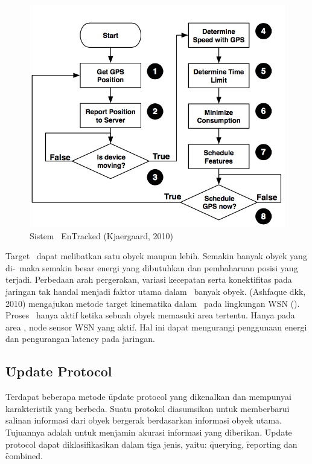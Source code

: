 \noindent
\begin{figure}
  \centering
  \includegraphics[scale=0.50]
  {images/2-entracked.png}
\caption{Sistem \Tracking~EnTracked (Kjaergaard, 2010)}
\label{fig:entracked}
\end{figure}

Target \tracking~dapat melibatkan satu obyek maupun lebih. Semakin banyak obyek
yang di-\tracking~maka semakin besar energi yang dibutuhkan dan pembaharuan
posisi yang terjadi. Perbedaan arah pergerakan, variasi kecepatan serta
konektifitas pada jaringan tak handal menjadi faktor utama dalam
\tracking~banyak obyek. (Ashfaque dkk, 2010) mengajukan metode target kinematika
dalam \tracking~pada lingkungan WSN (\wsn). Proses \tracking~hanya aktif ketika
sebuah obyek memasuki area tertentu.  Hanya pada area \tracking, node sensor WSN
yang aktif. Hal ini dapat mengurangi penggunaan energi dan pengurangan
\f{latency} pada jaringan.

\subsection{\f{Update Protocol}}

Terdapat beberapa metode \f{update protocol} yang dikenalkan dan mempunyai karakteristik
yang berbeda. Suatu protokol diasumsikan untuk memberbarui salinan informasi dari obyek
bergerak berdasarkan informasi obyek utama. Tujuannya adalah untuk menjamin akurasi informasi
yang diberikan. \f{Update protocol} dapat diklasifikasikan dalam tiga jenis, yaitu:
\f{querying}, \f{reporting} dan \f{combined}.


